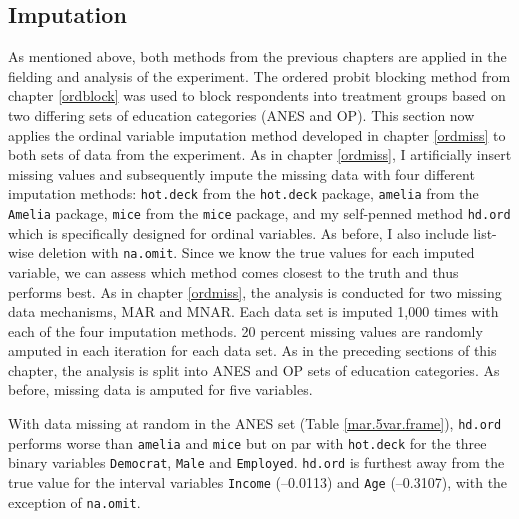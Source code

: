 \documentclass[12pt,econ]{sources/authesis}
\begin{document}
\hypertarget{framing-results-experiment-imputation}{%
\subsection{Imputation}\label{framing-results-experiment-imputation}}

\vspace{-9cm}

As mentioned above, both methods from the previous chapters are applied in the fielding and analysis of the experiment. The ordered probit blocking method from chapter \ref{ordblock} was used to block respondents into treatment groups based on two differing sets of education categories (ANES and OP). This section now applies the ordinal variable imputation method developed in chapter \ref{ordmiss} to both sets of data from the experiment. As in chapter \ref{ordmiss}, I artificially insert missing values and subsequently impute the missing data with four different imputation methods: \texttt{hot.deck} from the \texttt{hot.deck} package, \texttt{amelia} from the \texttt{Amelia} package, \texttt{mice} from the \texttt{mice} package, and my self-penned method \texttt{hd.ord} which is specifically designed for ordinal variables. As before, I also include list-wise deletion with \texttt{na.omit}. Since we know the true values for each imputed variable, we can assess which method comes closest to the truth and thus performs best. As in chapter \ref{ordmiss}, the analysis is conducted for two missing data mechanisms, MAR and MNAR. Each data set is imputed 1,000 times with each of the four imputation methods. 20 percent missing values are randomly amputed in each iteration for each data set. As in the preceding sections of this chapter, the analysis is split into ANES and OP sets of education categories. As before, missing data is amputed for five variables.

With data missing at random in the ANES set (Table \ref{mar.5var.frame}), \texttt{hd.ord} performs worse than \texttt{amelia} and \texttt{mice} but on par with \texttt{hot.deck} for the three binary variables \texttt{Democrat}, \texttt{Male} and \texttt{Employed}. \texttt{hd.ord} is furthest away from the true value for the interval variables \texttt{Income} (--0.0113) and \texttt{Age} (--0.3107), with the exception of \texttt{na.omit}.
\end{document}
